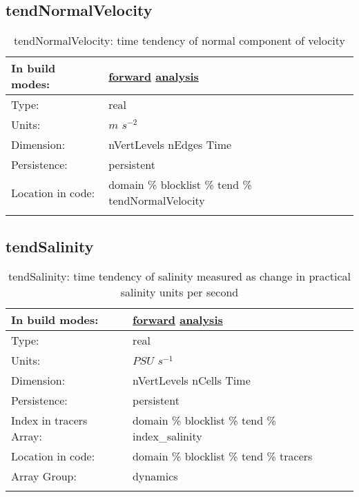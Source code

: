 \subsection[tendNormalVelocity]{tendNormalVelocity}
\label{subsec:var_sec_tend_tendNormalVelocity}
\begin{center}
\begin{longtable}{| p{2.0in} | p{4.0in} |}
        \hline 
        In build modes: & \hyperref[subsec:forward_var_tab_tend]{forward} \hyperref[subsec:analysis_var_tab_tend]{analysis} \\
        \hline 
        Type: & real \\
        \hline 
        Units: & $m$ $s^{-2}$ \\
        \hline 
        Dimension: & nVertLevels nEdges Time \\
        \hline 
        Persistence: & persistent \\
        \hline 
		 Location in code: & domain \% blocklist \% tend \% tendNormalVelocity \\
		 \hline 
    \caption{tendNormalVelocity: time tendency of normal component of velocity}
\end{longtable}
\end{center}
\subsection[tendSalinity]{tendSalinity}
\label{subsec:var_sec_tend_tendSalinity}
\begin{center}
\begin{longtable}{| p{2.0in} | p{4.0in} |}
        \hline 
        In build modes: & \hyperref[subsec:forward_var_tab_tend]{forward} \hyperref[subsec:analysis_var_tab_tend]{analysis} \\
        \hline 
        Type: & real \\
        \hline 
        Units: & $PSU$ $s^{-1}$ \\
        \hline 
        Dimension: & nVertLevels nCells Time \\
        \hline 
        Persistence: & persistent \\
        \hline 
		 Index in tracers Array: & domain \% blocklist \% tend \% index\_salinity \\
		 \hline 
		 Location in code: & domain \% blocklist \% tend \% tracers \\
		 \hline 
		 Array Group: & dynamics \\
		 \hline 
    \caption{tendSalinity: time tendency of salinity measured as change in practical salinity units per second}
\end{longtable}
\end{center}
